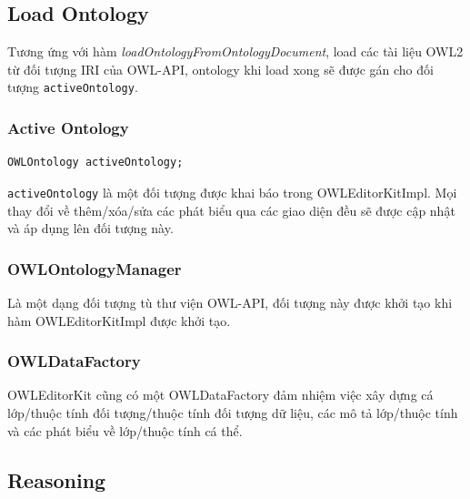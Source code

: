 \subsection{Load Ontology}
Tương ứng với hàm \textit{loadOntologyFromOntologyDocument}, load các tài liệu OWL2 từ đối tượng IRI của OWL-API, ontology khi load xong sẽ được gán cho đối tượng \verb|activeOntology|. 
\subsubsection{Active Ontology}
\begin{verbatim}
OWLOntology activeOntology;
\end{verbatim}
\verb|activeOntology| là một đối tượng được khai báo trong OWLEditorKitImpl. Mọi thay đổi về thêm/xóa/sửa các phát biểu qua các giao diện đều sẽ được cập nhật và áp dụng lên đối tượng này.
\subsubsection{OWLOntologyManager}
Là một dạng đối tượng tù thư viện OWL-API, đối tượng này được khởi tạo khi hàm OWLEditorKitImpl được khởi tạo.
\subsubsection{OWLDataFactory}
OWLEditorKit cũng có một OWLDataFactory đảm nhiệm việc xây dựng cá lớp/thuộc tính đối tượng/thuộc tính đối tượng dữ liệu, các mô tả lớp/thuộc tính và các phát biểu về lớp/thuộc tính cá thể.
\subsection{Reasoning}






















